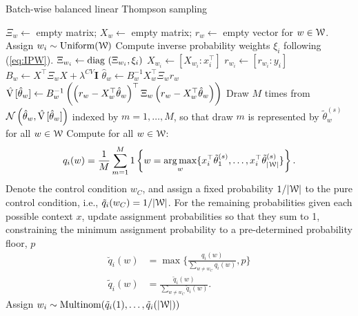 \documentclass[letterpaper, 12pt, parskip=full,]{scrartcl}
\begin{document}
\begin{algorithm}
    \caption{Batch-wise balanced linear Thompson sampling}
    \label{algg:bblts}
    \begin{algorithmic}[1] %
    	\State$\Xi_w \leftarrow$ empty matrix; $X_w \leftarrow$ empty matrix; $r_w \leftarrow$ empty vector for $w \in {\EuScript W}$. 
			\State Assign $w_i\sim \text{Uniform}({\EuScript W})$
			\State Compute inverse probability weights $\xi_i$ following (\ref{eq:IPW}).
			\State $\Xi_{w_i} \leftarrow {\textrm {diag} }\, \left(\Xi_{w_i}, \xi_i\right)$
			\State $X_{w_i} \leftarrow [X_{w_i}:x_i^\top]$ 
			\State $r_{w_i} \leftarrow  [r_{w_i}: y_i]$
					\State $B_w \leftarrow X^\top \Xi_w X + \lambda^{CV} \mathbf{I}$ 
					\State $\hat\theta_{w} \leftarrow B_w^{-1} X_w^\top \Xi_w r_w$
					\State $\hat{{\textrm V}\,}[\hat\theta_{w}] \leftarrow B_w^{-1} \left(\left( r_w - X_w^\top\hat\theta_{w} \right)^\top \Xi_w \left( r_w - X_w^\top\hat\theta_{w} \right)\right)$
				\EndFor
			\EndIf
			\State 				\State Draw $M$ times from $\mathcal{N}\left(\hat\theta_{w}, \hat{{\textrm V}\,}[\hat\theta_{w}] \right)$ indexed by $m = 1, \dots, M$, so that draw $m$ is represented by $\tilde \theta ^{(s)}_w$ for all $w \in {\EuScript W}$
				\State Compute for all $w \in {\EuScript W}$:
				\begin{align}
    q_i(w) = \frac{1}{M} \sum_{m=1}^M 1\left\{ w = \operatorname*{arg\,max}_w \{ x_i^\top \tilde \theta ^{(s)}_1, \dots, x_i^\top\tilde \theta_{|{\EuScript W}|}^{(s)} \}  \right\}. 
  				\end{align}
			\State Denote the control condition $w_{C}$, and assign a fixed probability $1/|{\EuScript W}|$ to the pure control condition, i.e., $\tilde{q}_{i}(w_{C}) = 1/|{\EuScript W}|$. For the remaining probabilities given each possible context $x$, update assignment probabilities so that they sum to 1, constraining the minimum assignment probability to a pre-determined probability floor, $p$
                          \begin{align}
                          \breve{q}_{i}(w) & =\max\Biggr\{\frac{ q_{i}(w)}{\sum\limits_{w \neq w_{C}}q_{i}(w) } , p\Biggr\} \\
                          \tilde{q}_{i}(w) & = \frac{ \breve q_{i}(w)}{\sum\limits_{w \neq w_{C}}\breve q_{i}(w) }. 
                          \end{align}
                          \State Assign $w_i \sim \textrm{Multinom}(\tilde{q}_{i}(1), \dots, \tilde{q}_{i}(|{\EuScript W}|))$
		\EndIf
	\EndFor
    \end{algorithmic}
\end{algorithm}
\clearpage
\end{document}
